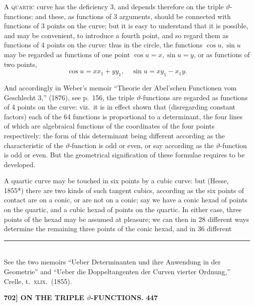 \documentclass[11pt]{article}
\begin{document}
\medskip

A \textsc{quartic} curve has the deficiency 3, and depends therefore on the triple $\vartheta$-functions: and these, as functions of 3 arguments, should be connected with functions of 3 points on the curve; but it is easy to understand that it is possible, and may be convenient, to introduce a fourth point, and so regard them as functions of 4 points on the curve: thus in the circle, the functions $\cos u, \sin u$ may be regarded as functions of one point $\cos u = x, \sin u = y$, or as functions of two points,
\[
\cos u = xx_1 + yy_1,\quad \sin u = xy_1 - x_1 y.
\]

And accordingly in Weber's memoir ``Theorie der Abel'schen Functionen vom Geschlecht 3,'' (1876), see p.~156, the triple $\vartheta$-functions are regarded as functions of 4 points on the curve: viz.\ it is in effect shown that (disregarding constant factors) each of the 64 functions is proportional to a determinant, the four lines of which are algebraical functions of the coordinates of the four points respectively: the form of this determinant being different according as the characteristic of the $\vartheta$-function is odd or even, or say according as the $\vartheta$-function is odd or even. But the geometrical signification of these formulae requires to be developed.

A quartic curve may be touched in six points by a cubic curve: but (Hesse, 1855*) there are two kinds of such tangent cubics, according as the six points of contact are on a conic, or are not on a conic; say we have a conic hexad of points on the quartic, and a cubic hexad of points on the quartic. In either case, three points of the hexad may be assumed at pleasure; we can then in 28 different ways determine the remaining three points of the conic hexad, and in 36 different

\medskip
\noindent\rule{2in}{0.4pt}\\
{\small * See the two memoirs ``Ueber Determinanten und ihre Anwendung in der Geometrie'' and ``Ueber die Doppeltangenten der Curven vierter Ordnung,'' Crelle, t.~\textsc{xlix}.~(1855).}

\bigskip
\noindent\textbf{702] \quad ON THE TRIPLE $\vartheta$-FUNCTIONS. \hfill 447}

\medskip
\end{document}
